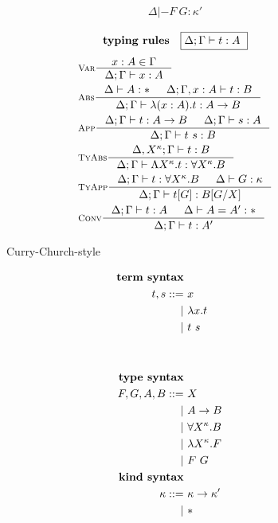 \begin{figure}
\begin{singlespace}
\begin{minipage}{.46\textwidth}
\begin{align*}
		      {\Delta |- F ~ G : \kappa'} \\
\end{align*}
\[ \textbf{typing rules} \quad \framebox{$ \Delta;\Gamma |- t : A $ } \]
\vspace*{-1em}
\begin{align*}
& \inference[\sc Var]{x:A \in \Gamma}{\Delta;\Gamma |- x:A} \\
& \inference[\sc Abs]{\Delta |- A:* & \Delta;\Gamma,x:A |- t : B}
		     {\Delta;\Gamma |- \l(x:A).t : A -> B} \\
& \inference[\sc App]{\Delta;\Gamma |- t : A -> B & \Delta;\Gamma |- s : A}
		     {\Delta;\Gamma |- t~s : B} \\
& \inference[\sc TyAbs]{\Delta,X^\kappa;\Gamma |- t : B}
		       {\Delta;\Gamma |- \L X^\kappa.t : \forall X^\kappa.B} \\
& \inference[\sc TyApp]{\Delta;\Gamma |- t : \forall X^\kappa.B & \Delta |- G:\kappa}
		       {\Delta;\Gamma |- t[G] : B[G/X]} \\
& \inference[\sc Conv]{\Delta;\Gamma |- t : A & \Delta |- A = A' : *}
		      {\Delta;\Gamma |- t : A'}
\end{align*}
\end{minipage}
\begin{minipage}{.46\textwidth}
	\begin{center}Curry-Church-style\end{center}\vspace*{-1em}
\def\baselinestretch{0}
\small
\begin{align*}
\textbf{term syntax} \\
t,s ::= &~ x           \\
      | &~ \l x    . t \\
      | &~ t ~ s       \\
      \phantom{|} &~ \\
      \phantom{|} &~ \\
\textbf{type syntax} \\
F,G,A,B ::= &~ X                  \\
          | &~ A -> B             \\
          | &~ \forall X^\kappa.B \\
          | &~ \l X^\kappa.F      \\
          | &~ F ~ G              \\
\textbf{kind syntax} \\
\kappa ::= &~ \kappa -> \kappa' \\
         | &~ *                 \\

\end{align*}
\end{minipage}
\end{singlespace}
\end{figure}
